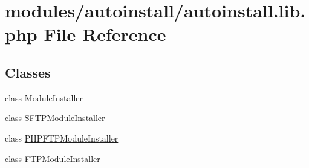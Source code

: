 \hypertarget{autoinstall_8lib_8php}{\section{modules/autoinstall/autoinstall.lib.\+php File Reference}
\label{autoinstall_8lib_8php}
}
\subsection*{Classes}
\begin{DoxyCompactItemize}
\item 
class \hyperlink{classModuleInstaller}{Module\+Installer}
\item 
class \hyperlink{classSFTPModuleInstaller}{S\+F\+T\+P\+Module\+Installer}
\item 
class \hyperlink{classPHPFTPModuleInstaller}{P\+H\+P\+F\+T\+P\+Module\+Installer}
\item 
class \hyperlink{classFTPModuleInstaller}{F\+T\+P\+Module\+Installer}
\end{DoxyCompactItemize}
